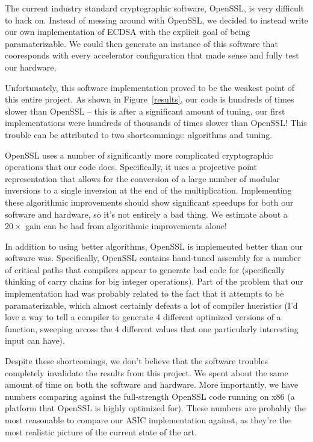 \documentclass[twocolumn]{article}
\begin{document}
The current industry standard cryptographic software, OpenSSL, is very
difficult to hack on.  Instead of messing around with OpenSSL, we
decided to instead write our own implementation of ECDSA with the
explicit goal of being paramaterizable.  We could then generate an
instance of this software that cooresponds with every accelerator
configuration that made sense and fully test our hardware.

Unfortunately, this software implementation proved to be the weakest
point of this entire project.  As shown in Figure~\ref{results}, our
code is hundreds of times slower than OpenSSL -- this is after a
significant amount of tuning, our first implementations were hundreds
of thousands of times slower than OpenSSL!  This trouble can be
attributed to two shortcommings: algorithms and tuning.

OpenSSL uses a number of significantly more complicated cryptographic
operations that our code does.  Specifically, it uses a projective
point representation that allows for the conversion of a large number
of modular inversions to a single inversion at the end of the
multiplication.  Implementing these algorithmic improvements should
show significant speedups for both our software and hardware, so it's
not entirely a bad thing.  We estimate about a $20\times$ gain can be
had from algorithmic improvements alone!

In addition to using better algorithms, OpenSSL is implemented better
than our software was.  Specifically, OpenSSL contains hand-tuned
assembly for a number of critical paths that compilers appear to
generate bad code for (specifically thinking of carry chains for
big integer operations).  Part of the problem that our implementation
had was probably related to the fact that it attempts to be
paramaterizable, which almost certainly defeats a lot of compiler
hueristics (I'd love a way to tell a compiler to generate 4 different
optimized versions of a function, sweeping arcoss the 4 different
values that one particularly interesting input can have).

Despite these shortcomings, we don't believe that the software troubles
completely invalidate the results from this project.  We spent about
the same amount of time on both the software and hardware. 
More importantly, we have numbers comparing
against the full-strength OpenSSL code running on x86 (a platform that
OpenSSL is highly optimized for\cite{kasper-openssl_ecc}).  These
numbers are probably the most reasonable to compare our ASIC
implementation against, as they're the most realistic picture of the
current state of the art.
\end{document}

